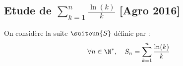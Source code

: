 \subsection{Etude de $\sum_{k=1}^n \frac{\ln(k)}{k}$ [Agro 2016]}

\begin{probleme}
On considère la suite $\suiteun{S}$ définie par :
$$\forall n\in \N^*, \quad S_n  =\sum_{k=1}^n \frac{\ln(k)}{k}$$


\end{probleme}
